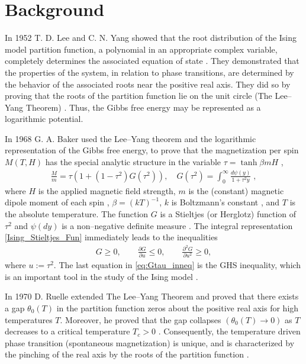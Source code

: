 \documentclass[english,12pt,jmp,graphicx]{revtex4-1}
\begin{document}
\section{Background}\label{sec:Background}
%
In 1952 T. D. Lee and C. N. Yang showed that the root distribution of
the Ising model partition function, a polynomial in an appropriate
complex variable, completely determines the associated equation of
state \cite{Yang:PR:404}. They demonstrated that the properties
of the system, in relation to phase transitions, are determined by the
behavior of the associated roots near the positive real axis. They did so by
proving that the roots of the partition function lie on the unit circle
(The Lee--Yang Theorem) \cite{Lee:PR:411,Ruelle-1969}. Thus, the Gibbs
free energy may be represented as a logarithmic potential.

In 1968 G. A. Baker used the
Lee--Yang theorem and the logarithmic representation of the Gibbs free
energy, to prove that the magnetization per spin $M(T,H)$
has the special analytic structure in the variable $\tau=\tanh{\beta mH}$
\cite{Baker:PRL-990}, 
%
\begin{align}\label{Ising_Stieltjes_Fun}
  \frac{M}{m} =\tau(1+(1-\tau^2)G(\tau^2)), \quad
  G(\tau^2)=\int_0^\infty\frac{d\psi(y)}{1+\tau^2y}\;, %
\end{align}
%
where $H$ is the applied magnetic field strength, $m$ is the
(constant) magnetic dipole moment of each spin \cite{Griffiths-1999},
$\beta=(kT)^{-1}$, $k$ is Boltzmann's constant \cite{Thompson-1988}, and
$T$ is the absolute temperature. The function $G$ is a Stieltjes (or
Herglotz) function of $\tau^2$ and $\psi(dy)$ is a non--negative definite
measure \cite{Baker:PRL-990}.  The integral representation
\eqref{Ising_Stieltjes_Fun} immediately leads to the inequalities   
%
\begin{align}\label{eq:Gtau_inneq}
  G\geq0, \qquad \frac{\partial G}{\partial u}\leq0, \qquad \frac{\partial^2G}{\partial u^2}\geq0,
\end{align}
%
where $u:=\tau^2$. The last equation in \eqref{eq:Gtau_inneq} is the GHS
inequality, which is an important tool in the study of the Ising model
\cite{Golden:JMP-5627}. 

In 1970 D. Ruelle extended The Lee--Yang Theorem and proved that
there exists a gap $\theta_0(T)$ in the partition function zeros about the
positive real axis for high temperatures $T$. Moreover, he proved that
the gap collapses $(\theta_0(T)\to0)$ as $T$ decreases to a critical
temperature $T_c>0$ \cite{Ruelle:PRL:303}. Consequently, the
temperature driven phase transition (spontaneous magnetization) is
unique, and is characterized by the pinching of the real axis by the
roots of the partition function \cite{Ruelle-1969,Ruelle:AM:589}. 
\end{document}
